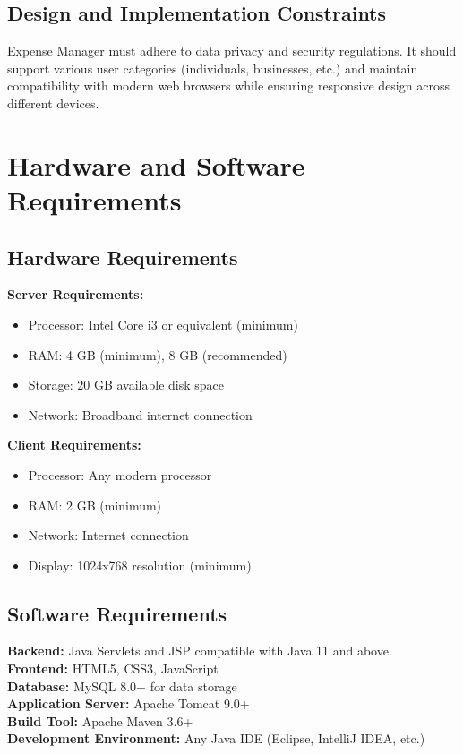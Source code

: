 \subsection{Design and Implementation Constraints}

Expense Manager must adhere to data privacy and security regulations. It should support various user categories (individuals, businesses, etc.) and maintain compatibility with modern web browsers while ensuring responsive design across different devices.

\section{Hardware and Software Requirements}

\subsection{Hardware Requirements}

\textbf{Server Requirements:}
\begin{itemize}
\item Processor: Intel Core i3 or equivalent (minimum)
\item RAM: 4 GB (minimum), 8 GB (recommended)
\item Storage: 20 GB available disk space
\item Network: Broadband internet connection
\end{itemize}

\textbf{Client Requirements:}
\begin{itemize}
\item Processor: Any modern processor
\item RAM: 2 GB (minimum)
\item Network: Internet connection
\item Display: 1024x768 resolution (minimum)
\end{itemize}

\subsection{Software Requirements}

\textbf{Backend:} Java Servlets and JSP compatible with Java 11 and above.\\
\textbf{Frontend:} HTML5, CSS3, JavaScript\\
\textbf{Database:} MySQL 8.0+ for data storage\\
\textbf{Application Server:} Apache Tomcat 9.0+\\
\textbf{Build Tool:} Apache Maven 3.6+\\
\textbf{Development Environment:} Any Java IDE (Eclipse, IntelliJ IDEA, etc.)

